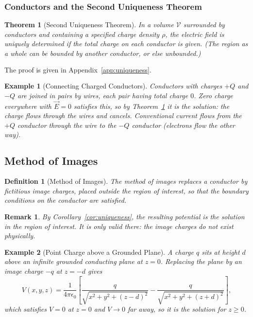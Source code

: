 \documentclass{article}
\newtheorem{theorem}{Theorem}
\newtheorem{definition}{Definition}
\newtheorem*{example}{Example}
\newtheorem{remark}{Remark}
\begin{document}
\subsubsection{Conductors and the Second Uniqueness Theorem}
\begin{theorem}[Second Uniqueness Theorem]
    \label{thm:uniqueness2}
    In a volume $\mathcal{V}$ surrounded by conductors and containing a specified charge density $\rho$, the electric field is uniquely determined if the total charge on each conductor is given. (The region as a whole can be bounded by another conductor, or else unbounded.)
\end{theorem}
\noindent The proof is given in Appendix~\ref{app:uniqueness}.
\begin{example}[Connecting Charged Conductors]
    Conductors with charges $+Q$ and $-Q$ are joined in pairs by wires, each pair having total charge $0$. Zero charge everywhere with $\vec{E} = 0$ satisfies this, so by Theorem~\ref{thm:uniqueness2} it is the solution: the charge flows through the wires and cancels. Conventional current flows from the $+Q$ conductor through the wire to the $-Q$ conductor (electrons flow the other way).
\end{example}

\subsection{Method of Images}
\begin{definition}[Method of Images]
    The method of images replaces a conductor by fictitious image charges, placed outside the region of interest, so that the boundary conditions on the conductor are satisfied.
\end{definition}
\begin{remark}
    By Corollary~\ref{cor:uniqueness}, the resulting potential is the solution in the region of interest. It is only valid there: the image charges do not exist physically.
\end{remark}
\begin{example}[Point Charge above a Grounded Plane]
    A charge $q$ sits at height $d$ above an infinite grounded conducting plane at $z=0$. Replacing the plane by an image charge $-q$ at $z=-d$ gives
    \[V(x,y,z) = \frac{1}{4\pi\epsilon_0}\left[\frac{q}{\sqrt{x^2+y^2+(z-d)^2}} - \frac{q}{\sqrt{x^2+y^2+(z+d)^2}}\right],\]
    which satisfies $V=0$ at $z=0$ and $V\to 0$ far away, so it is the solution for $z\geq 0$.
\end{example}
\end{document}

